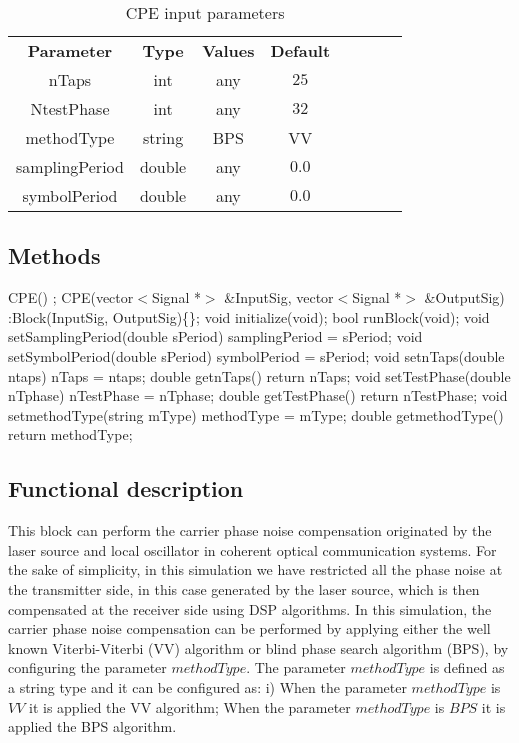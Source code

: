 \begin{table}[h]
	\centering
	\begin{tabular}{|c|c|c|c|cccc}
		\cline{1-4}
		\textbf{Parameter} & \textbf{Type} & \textbf{Values} &   \textbf{Default}& \\ \cline{1-4}
		nTaps              & int & any & $25$ \\ \cline{1-4}
        NtestPhase         & int & any & $32$ \\ \cline{1-4}
        methodType         & string & BPS & VV \\ \cline{1-4}
		samplingPeriod     & double & any & $0.0$ \\ \cline{1-4}	
        symbolPeriod       & double & any & $0.0$ \\ \cline{1-4}	
	\end{tabular}
	\caption{CPE input parameters}
	\label{table:cpe_in_par_bps}
\end{table}

\subsection*{Methods}

CPE() {};
\bigbreak
CPE(vector$<$Signal *$>$ \&InputSig, vector$<$Signal *$>$ \&OutputSig) :Block(InputSig, OutputSig)\{\};
\bigbreak
void initialize(void);
\bigbreak
bool runBlock(void);
\bigbreak
void setSamplingPeriod(double sPeriod) { samplingPeriod = sPeriod; }
\bigbreak
void setSymbolPeriod(double sPeriod) { symbolPeriod = sPeriod; }
\bigbreak
void setnTaps(double ntaps) { nTaps = ntaps; }
\bigbreak
double getnTaps() { return nTaps; }
\bigbreak
void setTestPhase(double nTphase) { nTestPhase = nTphase; }
\bigbreak
double getTestPhase() { return nTestPhase; }
\bigbreak
void setmethodType(string mType) { methodType = mType; }
\bigbreak
double getmethodType() { return methodType; }

\subsection*{Functional description}

This block can perform the carrier phase noise compensation originated by the laser source and local oscillator in coherent optical communication systems. For the sake of simplicity, in this simulation we have restricted all the phase noise at the transmitter side, in this case generated by the laser source, which is then compensated at the receiver side using DSP algorithms.
In this simulation, the carrier phase noise compensation can be performed by applying either the well known Viterbi-Viterbi (VV) algorithm or blind phase search algorithm (BPS), by configuring the parameter $methodType$. The parameter $methodType$ is defined as a string type and it can be configured as: i) When the parameter $methodType$ is $\textit{VV}$ it is applied the VV algorithm; When the parameter $methodType$ is $\textit{BPS}$ it is applied the BPS algorithm.


